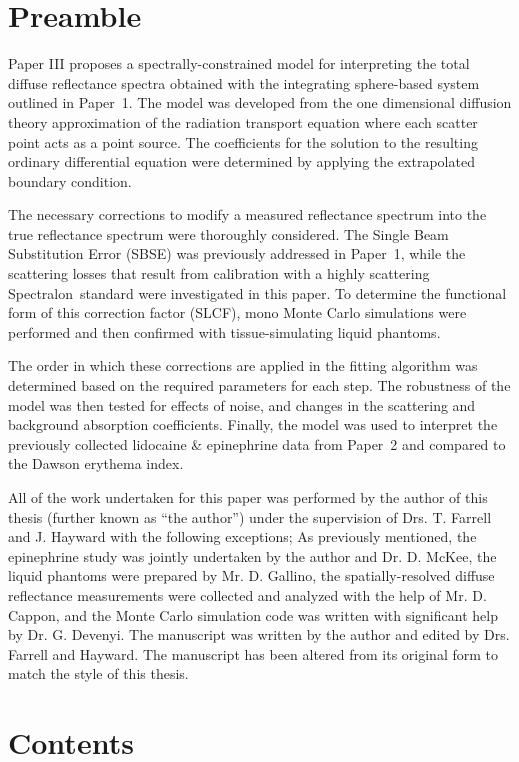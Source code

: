 \section*{Preamble}
Paper III proposes a spectrally-constrained model for interpreting the total diffuse reflectance spectra obtained with the integrating sphere-based system outlined in Paper~1. The model was developed from the one dimensional diffusion theory approximation of the radiation transport equation\cite{Farrell1992} where each scatter point acts as a point source. The coefficients for the solution to the resulting ordinary differential equation were determined by applying the extrapolated boundary condition.

The necessary corrections to modify a measured reflectance spectrum into the true reflectance spectrum were thoroughly considered. The Single Beam Substitution Error (SBSE) was previously addressed in Paper~1, while the scattering losses that result from calibration with a highly scattering Spectralon\textregistered~standard were investigated in this paper. To determine the functional form of this correction factor (SLCF), mono Monte Carlo simulations were performed and then confirmed with tissue-simulating liquid phantoms.

The order in which these corrections are applied in the fitting algorithm was determined based on the required parameters for each step. The robustness of the model was then tested for effects of noise, and changes in the scattering and background absorption coefficients. Finally, the model was used to interpret the previously collected lidocaine \& epinephrine data from Paper~2 and compared to the Dawson erythema index.\cite{Dawson1980}

All of the work undertaken for this paper was performed by the author of this thesis (further known as ``the author'') under the supervision of Drs. T. Farrell and J. Hayward with the following exceptions; As previously mentioned, the epinephrine study was jointly undertaken by the author and Dr. D. McKee, the liquid phantoms were prepared by Mr. D. Gallino, the spatially-resolved diffuse reflectance measurements were collected and analyzed with the help of Mr. D. Cappon, and the Monte Carlo simulation code was written with significant help by Dr. G. Devenyi. The manuscript was written by the author and edited by Drs. Farrell and Hayward. The manuscript has been altered from its original form to match the style of this thesis.

\section*{Contents}


